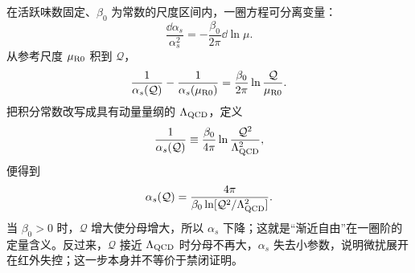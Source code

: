 \begin{derivation}[一圈强耦合演化与尺度参数]
在活跃味数固定、\(\beta_0\) 为常数的尺度区间内，一圈方程可分离变量：
\begin{equation*}
\frac{\dd\alpha_s}{\alpha_s^2}
=-\frac{\beta_0}{2\pi}\dd\ln\mu.
\end{equation*}
从参考尺度 \(\mu_{\rm R0}\) 积到 \(\mathcal Q\)，
\begin{equation*}
\frac1{\alpha_s(\mathcal Q)}
-\frac1{\alpha_s(\mu_{\rm R0})}
=\frac{\beta_0}{2\pi}
\ln\frac{\mathcal Q}{\mu_{\rm R0}}.
\end{equation*}
把积分常数改写成具有动量量纲的 \(\Lambda_{\rm QCD}\)，定义
\begin{equation*}
\frac1{\alpha_s(\mathcal Q)}
\equiv
\frac{\beta_0}{4\pi}
\ln\frac{\mathcal Q^2}{\Lambda_{\rm QCD}^2},
\end{equation*}
便得到
\begin{equation*}
{
\alpha_s(\mathcal Q)
=\frac{4\pi}{\beta_0
\ln[\mathcal Q^2/\Lambda_{\rm QCD}^2]}.}
\end{equation*}
当 \(\beta_0>0\) 时，\(\mathcal Q\) 增大使分母增大，所以 \(\alpha_s\) 下降；这就是“渐近自由”在一圈阶的定量含义。反过来，\(\mathcal Q\) 接近 \(\Lambda_{\rm QCD}\) 时分母不再大，\(\alpha_s\) 失去小参数，说明微扰展开在红外失控；这一步本身并不等价于禁闭证明。
\end{derivation}

